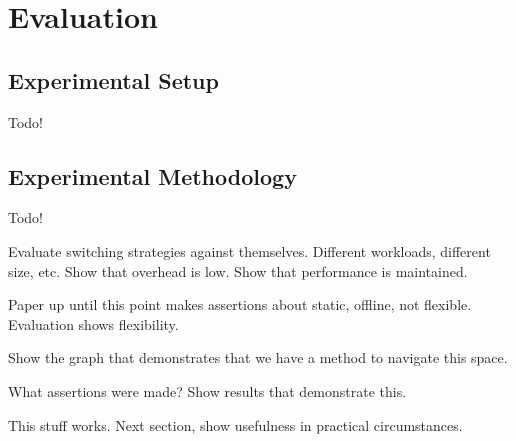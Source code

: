\section{Evaluation}\label{sec:evaluation}

\subsection{Experimental Setup}

Todo!

\subsection{Experimental Methodology}

Todo!

Evaluate switching strategies against themselves. Different workloads, different size, etc. Show that overhead is low. Show that performance is maintained.

Paper up until this point makes assertions about static, offline, not flexible. Evaluation shows flexibility.

Show the graph that demonstrates that we have a method to navigate this space.

What assertions were made? Show results that demonstrate this.

This stuff works. Next section, show usefulness in practical circumstances.

